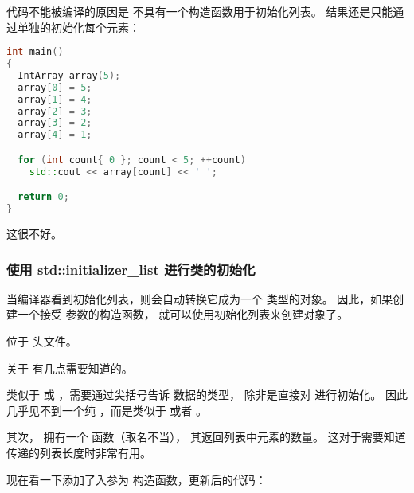 \documentclass[../../LearnCpp.tex]{subfiles}
\begin{document}
代码不能被编译的原因是  不具有一个构造函数用于初始化列表。
结果还是只能通过单独的初始化每个元素：

\begin{lstlisting}[language=C++]
int main()
{
  IntArray array(5);
  array[0] = 5;
  array[1] = 4;
  array[2] = 3;
  array[3] = 2;
  array[4] = 1;

  for (int count{ 0 }; count < 5; ++count)
    std::cout << array[count] << ' ';

  return 0;
}
\end{lstlisting}

这很不好。

\subsubsection*{使用 std::initializer\_list 进行类的初始化}

当编译器看到初始化列表，则会自动转换它成为一个  类型的对象。
因此，如果创建一个接受  参数的构造函数，
就可以使用初始化列表来创建对象了。

 位于  头文件。

关于  有几点需要知道的。

类似于  或 ，需要通过尖括号告诉  数据的类型，
除非是直接对  进行初始化。
因此几乎见不到一个纯 ，而是类似于  或者 。

其次， 拥有一个  函数（取名不当），
其返回列表中元素的数量。
这对于需要知道传递的列表长度时非常有用。

现在看一下添加了入参为  构造函数，更新后的代码：
\end{document}
